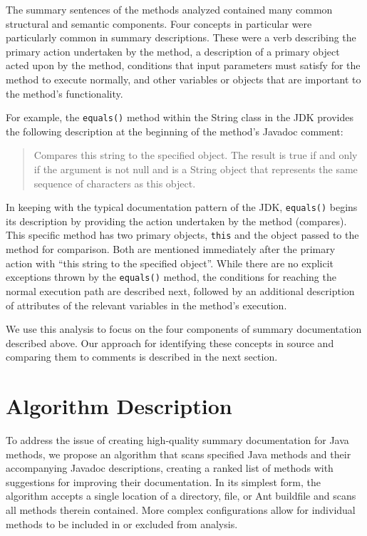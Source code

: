 \documentclass[preprint]{sigplanconf}
\begin{document}
The summary sentences of the methods analyzed contained many common structural and semantic components. Four concepts in particular were particularly common in summary descriptions. These were a verb describing the primary action undertaken by the method, a description of a primary object acted upon by the method, conditions that input parameters must satisfy for the method to execute normally, and other variables or objects that are important to the method's functionality.

For example, the \verb|equals()| method within the String class in the JDK provides the following description at the beginning of the method's Javadoc comment:

\begin{quotation}
Compares this string to the specified object. The result is true if and only if the argument is not null and is a String object that represents the same sequence of characters as this object.
\end{quotation}

In keeping with the typical documentation pattern of the JDK, \verb|equals()| begins its description by providing the action undertaken by the method (compares). This specific method has two primary objects, \verb|this| and the object passed to the method for comparison. Both are mentioned immediately after the primary action with ``this string to the specified object''. While there are no explicit exceptions thrown by the \verb|equals()| method, the conditions for reaching the normal execution path are described next, followed by an additional description of attributes of the relevant variables in the method's execution.

We use this analysis to focus on the four components of summary documentation described above. Our approach for identifying these concepts in source and comparing them to comments is described in the next section.

\section{Algorithm Description}
To address the issue of creating high-quality summary documentation for Java methods, we propose an algorithm that scans specified Java methods and their accompanying Javadoc descriptions, creating a ranked list of methods with suggestions for improving their documentation. In its simplest form, the algorithm accepts a single location of a directory, file, or Ant buildfile and scans all methods therein contained. More complex configurations allow for individual methods to be included in or excluded from analysis.
\end{document}
